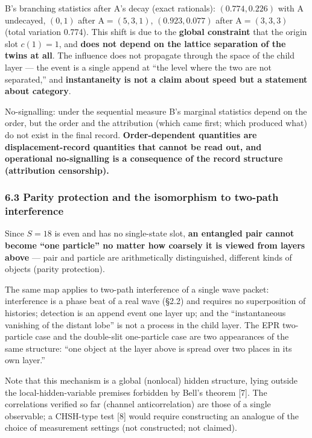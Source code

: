 \documentclass[
]{ltjsarticle}
\begin{document}
B's branching statistics after A's decay (exact rationals):
\((0.774,0.226)\) with A undecayed, \((0,1)\) after A\(=(5,3,1)\),
\((0.923,0.077)\) after A\(=(3,3,3)\) (total variation 0.774). This
shift is due to the \textbf{global constraint} that the origin slot
\(c(1)=1\), and \textbf{does not depend on the lattice separation of the
twins at all}. The influence does not propagate through the space of the
child layer --- the event is a single append at ``the level where the
two are not separated,'' and \textbf{instantaneity is not a claim about
speed but a statement about category}.

No-signalling: under the sequential measure B's marginal statistics
depend on the order, but the order and the attribution (which came
first; which produced what) do not exist in the final record.
\textbf{Order-dependent quantities are displacement-record quantities
that cannot be read out, and operational no-signalling is a consequence
of the record structure (attribution censorship).}

\subsubsection{6.3 Parity protection and the isomorphism to two-path
interference}\label{parity-protection-and-the-isomorphism-to-two-path-interference}

Since \(S=18\) is even and has no single-state slot, \textbf{an
entangled pair cannot become ``one particle'' no matter how coarsely it
is viewed from layers above} --- pair and particle are arithmetically
distinguished, different kinds of objects (parity protection).

The same map applies to two-path interference of a single wave packet:
interference is a phase beat of a real wave (§2.2) and requires no
superposition of histories; detection is an append event one layer up;
and the ``instantaneous vanishing of the distant lobe'' is not a process
in the child layer. The EPR two-particle case and the double-slit
one-particle case are two appearances of the same structure: ``one
object at the layer above is spread over two places in its own layer.''

Note that this mechanism is a global (nonlocal) hidden structure, lying
outside the local-hidden-variable premises forbidden by Bell's theorem
{[}7{]}. The correlations verified so far (channel anticorrelation) are
those of a single observable; a CHSH-type test {[}8{]} would require
constructing an analogue of the choice of measurement settings (not
constructed; not claimed).
\end{document}

